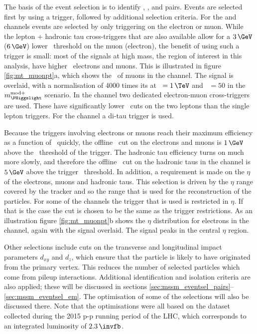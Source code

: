The basis of the event selection is to identify \mutau, \etau,
\tautau and \emu pairs. Events are selected first by using a trigger,
followed by additional selection criteria. For the \etau
and \mutau channels events are selected by only triggering on the electron or muon. 
While the lepton + hadronic tau cross-triggers that are also available
allow for a $3\,\GeV$ ($6\,\GeV$) lower \pT~threshold on the
muon (electron), the benefit of using such a trigger is small: 
most of the signals at high mass, the region of interest in this
analysis, have higher \pT~electrons and muons. This is illustrated
in figure \ref{fig:mt_muonpt}a, which shows the \pT~of muons in the
\mutau channel. The signal is overlaid, with a normalisation of 4000 times its \xsbr 
 at \mA~$=1\,\TeV$ and \tanb~$=50$ in the $m_{\PHiggslight}^{\text{mod}+}$ scenario.
In the \emu channel two dedicated electron-muon cross-triggers
are used. These have significantly lower \pT~cuts 
on the two leptons than the single lepton triggers. For the 
\tautau channel a di-tau trigger is used.

Because the triggers involving electrons or muons reach 
their maximum efficiency as a function of \pT~quickly, the offline \pT~cut
on the electrons and muons is $1\,\GeV$ above the \pT~threshold of the trigger. The
hadronic tau efficiency turns on much more slowly, and therefore the offline \pT~cut
on the hadronic taus in the \tautau channel is $5\,\GeV$ above the trigger \pT~threshold.
In addition, a requirement is made on the $\eta$ of the electrons, muons and
hadronic taus. This selection is driven by the $\eta$ range covered by the tracker and
so the range that is used for the reconstruction of the particles. For some of the
channels the trigger that is used is restricted in $\eta$. If that is the case
the cut is chosen to be the same as the trigger restrictions.
As an illustration figure \ref{fig:mt_muonpt}b shows
the $\eta$ distribution for electrons in the \etau channel, again with the signal overlaid.
The signal peaks in the central $\eta$ region.

Other selections include cuts on the transverse and longitudinal impact parameters $d_{xy}$ and $d_{z}$, which
ensure that the particle is likely to have
originated from the primary vertex. This reduces the number of selected particles
which come from pileup interactions.
Additional identification and isolation criteria
are also applied; these will be discussed in sections \ref{sec:mssm_eventsel_pairs}--\ref{sec:mssm_eventsel_em}.
The optimisation of some of the selections will also be discussed there. Note that 
the optimisations were all based on the dataset collected during the 2015 p-p running period of the \ac{LHC}, which
corresponds to an integrated luminosity of $2.3\,\invfb$. 

